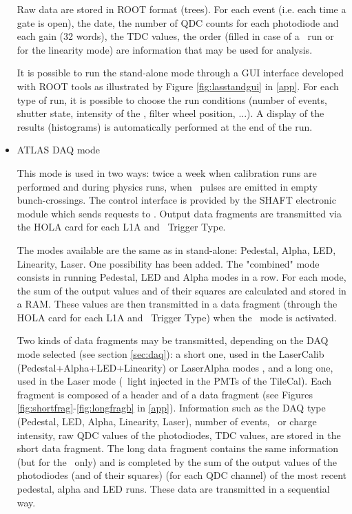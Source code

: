 \begin{itemize}
Raw data are stored in ROOT \cite{ref:root} format (trees). For each event (i.e. each time a gate is open), the date, the number of QDC counts for each photodiode and each gain (32 words), the TDC values, the order (filled in case of a \laser~run or for the linearity mode) are information that may be used for analysis. 

It is possible to run the stand-alone mode through a GUI interface developed with ROOT tools as illustrated by Figure \ref{fig:lasstandgui} in \ref{app}. For each type of run, it is possible to choose the run conditions (number of events, shutter state, intensity of the \laser, filter wheel position, ...). A display of the results (histograms) is automatically performed at the end of the run.

\item ATLAS DAQ mode

This mode is used in two ways: twice a week when calibration runs are performed and during physics runs, when \laser~pulses are emitted in empty bunch-crossings. The control interface is provided by the SHAFT electronic module which sends requests to \lascar. Output data fragments are transmitted via the HOLA card for each L1A and \laser~Trigger Type.

The modes available are the same as in stand-alone: Pedestal, Alpha, LED, Linearity, Laser. One possibility has been added. The "combined" mode consists in running Pedestal, LED and Alpha modes in a row. For each mode, the sum of the output values and of their squares are calculated and stored in a RAM. These values are then transmitted in a data fragment (through the HOLA card for each L1A and \laser~Trigger Type) when the \laser~mode is activated.

Two kinds of data fragments may be transmitted, depending on the DAQ mode selected (see section \ref{sec:daq}): a short one, used in the LaserCalib (Pedestal+Alpha+LED+Linearity) or LaserAlpha modes , and a long one, used in the Laser mode (\laser~light injected in the PMTs of the TileCal). Each fragment is composed of a header and of a data fragment (see Figures \ref{fig:shortfrag}-\ref{fig:longfragb} in \ref{app}). Information such as the DAQ type (Pedestal, LED, Alpha, Linearity, Laser), number of events, \laser~or charge intensity, raw QDC values of the photodiodes, TDC values, are stored in the short data fragment. The long data fragment contains the same information (but for the \laser~only) and is completed by the sum of the output values of the photodiodes (and of their squares) (for each QDC channel) of the most recent pedestal, alpha and LED runs. These data are transmitted in a sequential way. 

\end{itemize}
